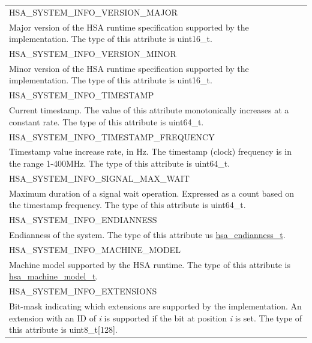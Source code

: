 \documentclass[final,oneside]{book}
\newcommand{\reftyp}[1]{#1}
\newcommand{\refenu}[1]{\reftyp{#1}}
\begin{document}
\begin{longtable}{@{\hspace{2em}}p{\linewidth-2em}}
\hspace{-2em}\refenu{HSA_\-SYSTEM_\-INFO_\-VERSION_\-MAJOR}\\Major version of the HSA runtime specification supported by the implementation. The type of this attribute is uint16_\-t.\\[2mm]
\hspace{-2em}\refenu{HSA_\-SYSTEM_\-INFO_\-VERSION_\-MINOR}\\Minor version of the HSA runtime specification supported by the implementation. The type of this attribute is uint16_\-t.\\[2mm]
\hspace{-2em}\refenu{HSA_\-SYSTEM_\-INFO_\-TIMESTAMP}\\Current timestamp. The value of this attribute monotonically increases at a constant rate. The type of this attribute is uint64_\-t.\\[2mm]
\hspace{-2em}\refenu{HSA_\-SYSTEM_\-INFO_\-TIMESTAMP_\-FREQUENCY}\\Timestamp value increase rate, in Hz. The timestamp (clock) frequency is in the range 1-400MHz. The type of this attribute is uint64_\-t.\\[2mm]
\hspace{-2em}\refenu{HSA_\-SYSTEM_\-INFO_\-SIGNAL_\-MAX_\-WAIT}\\Maximum duration of a signal wait operation. Expressed as a count based on the timestamp frequency. The type of this attribute is uint64_\-t.\\[2mm]
\hspace{-2em}\refenu{HSA_\-SYSTEM_\-INFO_\-ENDIANNESS}\\Endianness of the system. The type of this attribute us \hyperlink{group__agentinfo_1ga44cf02813960c252edfeeec6e0b6c848}{hsa_\-endianness_\-t}.\\[2mm]
\hspace{-2em}\refenu{HSA_\-SYSTEM_\-INFO_\-MACHINE_\-MODEL}\\Machine model supported by the HSA runtime. The type of this attribute is \hyperlink{group__agentinfo_1ga4d45919fd6f6e8dbb8ae2f4030870e11}{hsa_\-machine_\-model_\-t}.\\[2mm]
\hspace{-2em}\refenu{HSA_\-SYSTEM_\-INFO_\-EXTENSIONS}\\Bit-mask indicating which extensions are supported by the implementation. An extension with an ID of \textit{i} is supported if the bit at position \textit{i} is set. The type of this attribute is uint8_t[128].
\end{longtable}
\end{document}
